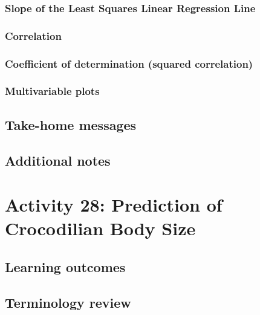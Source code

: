 \documentclass[
]{report}
\begin{document}
\subsubsection*{Slope of the Least Squares Linear Regression Line}\label{slope-of-the-least-squares-linear-regression-line}

\subsubsection*{Correlation}\label{correlation-2}

\subsubsection*{Coefficient of determination (squared correlation)}\label{coefficient-of-determination-squared-correlation}

\subsubsection*{Multivariable plots}\label{multivariable-plots}

\subsection{Take-home messages}\label{take-home-messages-25}

\subsection{Additional notes}\label{additional-notes-26}

\section{Activity 28: Prediction of Crocodilian Body Size}\label{activity-28-prediction-of-crocodilian-body-size}

\subsection{Learning outcomes}\label{learning-outcomes-32}

\subsection{Terminology review}\label{terminology-review-25}
\end{document}
